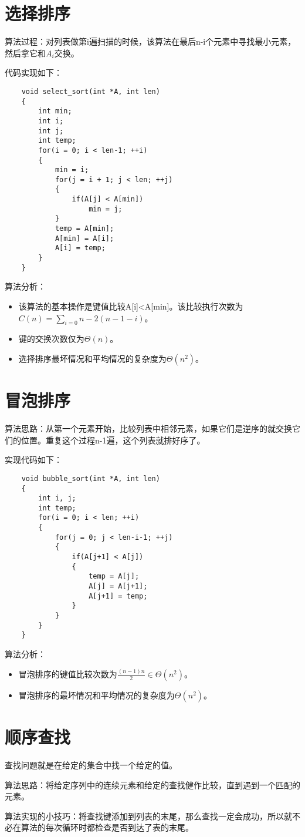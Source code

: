 \documentclass[a4paper,left=2.5cm,right=2.5cm,11pt]{article}
\begin{document}
\tableofcontents

\clearpage

\section{选择排序}
	算法过程：对列表做第i遍扫描的时候，该算法在最后n-i个元素中寻找最小元素，然后拿它和$A_i$交换。\par

	代码实现如下：
	\begin{lstlisting}
	void select_sort(int *A, int len)
	{
		int min;
		int i;
		int j;
		int temp;
		for(i = 0; i < len-1; ++i)
		{
			min = i;
			for(j = i + 1; j < len; ++j)
			{
				if(A[j] < A[min])
					min = j;
			}
			temp = A[min];
			A[min] = A[i];
			A[i] = temp;
		}
	}
	\end{lstlisting}

	算法分析：
	\begin{itemize}
		\item 该算法的基本操作是键值比较A[i]<A[min]。该比较执行次数为$C(n)=\sum_{i=0}{n-2}(n-1-i)$。
		\item 键的交换次数仅为$\Theta(n)$。
		\item 选择排序最坏情况和平均情况的复杂度为$\Theta(n^2)$。
	\end{itemize}

\section{冒泡排序}
	算法思路：从第一个元素开始，比较列表中相邻元素，如果它们是逆序的就交换它们的位置。重复这个过程n-1遍，这个列表就排好序了。

	实现代码如下：
	\begin{lstlisting}
	void bubble_sort(int *A, int len)
	{
		int i, j;
		int temp;
		for(i = 0; i < len; ++i)
		{
			for(j = 0; j < len-i-1; ++j)
			{
				if(A[j+1] < A[j])
				{
					temp = A[j];
					A[j] = A[j+1];
					A[j+1] = temp;
				}
			}
		}
	}
	\end{lstlisting}

	算法分析：
	\begin{itemize}
		\item 冒泡排序的键值比较次数为$\frac{(n-1)n}{2} \in \Theta(n^2)$。
		\item 冒泡排序的最坏情况和平均情况的复杂度为$\Theta(n^2)$。
	\end{itemize}

\section{顺序查找}
	查找问题就是在给定的集合中找一个给定的值。\par
	算法思路：将给定序列中的连续元素和给定的查找健作比较，直到遇到一个匹配的元素。\par
	算法实现的小技巧：将查找键添加到列表的末尾，那么查找一定会成功，所以就不必在算法的每次循环时都检查是否到达了表的末尾。
\end{document}

